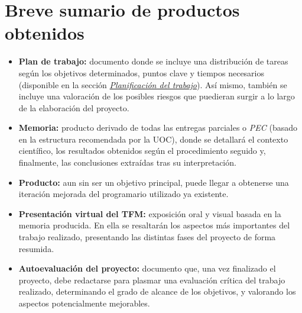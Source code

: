 \documentclass[IB,BIB]{TFUOC}%
\begin{document}
\normalsize


\section{Breve sumario de productos obtenidos}
\label{sec:Breve sumario de productos obtenidos}



\footnotesize

\begin{itemize}
    \item \textbf{Plan de trabajo:} documento donde se incluye una distribución de tareas según los objetivos determinados, puntos clave y tiempos necesarios (disponible en la sección \textit{\hyperref[sec:Planificación del trabajo]{Planificación del trabajo}}). Así mismo, también se incluye una valoración de los posibles riesgos que puedieran surgir a lo largo de la elaboración del proyecto.
    \item \textbf{Memoria:} producto derivado de todas las entregas parciales o \textit{PEC} (basado en la estructura recomendada por la UOC), donde se detallará el contexto científico, los resultados obtenidos según el procedimiento seguido y, finalmente, las conclusiones extraídas tras su interpretación.
    \item \textbf{Producto:} aun sin ser un objetivo principal, puede llegar a obtenerse una iteración mejorada del programario utilizado ya existente.
    \item \textbf{Presentación virtual del TFM:} exposición oral y visual basada en la memoria producida. En ella se resaltarán los aspectos más importantes del trabajo realizado, presentando las distintas fases del proyecto de forma resumida.
    \item \textbf{Autoevaluación del proyecto:} documento que, una vez finalizado el proyecto, debe redactarse para plasmar una evaluación crítica del trabajo realizado, determinando el grado de alcance de los objetivos, y valorando los aspectos potencialmente mejorables.
\end{itemize}
\end{document}
